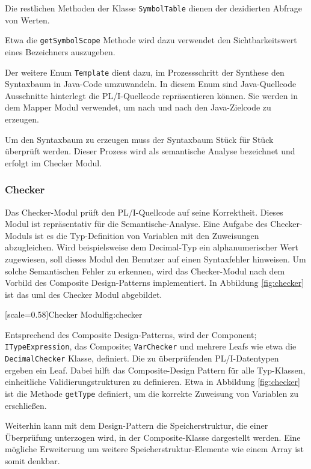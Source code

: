 Die restlichen Methoden der Klasse \verb+SymbolTable+ dienen der dezidierten Abfrage von Werten.

Etwa die \verb+getSymbolScope+ Methode wird dazu verwendet den Sichtbarkeitswert eines Bezeichners auszugeben.

Der weitere Enum \verb+Template+ dient dazu, im Prozessschritt der Synthese den Syntaxbaum in Java-Code umzuwandeln.
In diesem Enum sind Java-Quellcode Ausschnitte hinterlegt die PL/I-Quellcode repräsentieren können. Sie werden in dem Mapper Modul verwendet,
um nach und nach den Java-Zielcode zu erzeugen.

Um den Syntaxbaum zu erzeugen muss der Syntaxbaum Stück für Stück überprüft werden. Dieser Prozess wird als semantische Analyse bezeichnet und erfolgt im Checker Modul.
 
 \pagebreak
\subsubsection{Checker}
Das Checker-Modul prüft den PL/I-Quellcode auf seine Korrektheit. 
Dieses Modul ist repräsentativ für die Semantische-Analyse. 
Eine Aufgabe des Checker-Moduls ist es die Typ-Definition von Variablen mit den Zuweisungen abzugleichen.
Wird beispielsweise dem Decimal-Typ ein alphanumerischer Wert zugewiesen, soll dieses Modul den Benutzer auf einen Syntaxfehler hinweisen. Um solche Semantischen Fehler zu erkennen, wird das Checker-Modul nach dem Vorbild des Composite Design-Patterns implementiert. In Abbildung \ref{fig:checker} ist das \ac{uml} des Checker Modul abgebildet.

[scale=0.58]{Checker Modul}{fig:checker}
\pagebreak

Entsprechend des Composite Design-Patterns, wird der Component; \verb+ITypeExpression+, das Composite; \verb+VarChecker+ und mehrere Leafs wie etwa die \verb+DecimalChecker+ Klasse, definiert.
Die zu überprüfenden PL/I-Datentypen ergeben ein Leaf.
Dabei hilft das Composite-Design Pattern für alle Typ-Klassen, einheitliche Validierungstrukturen zu definieren.
Etwa in Abbildung \ref{fig:checker} ist die Methode \verb+getType+ definiert, um die korrekte Zuweisung von Variablen zu erschließen. 

Weiterhin kann mit dem Design-Pattern die Speicherstruktur, die einer Überprüfung unterzogen wird, in der Composite-Klasse dargestellt werden.
Eine mögliche Erweiterung um weitere Speicherstruktur-Elemente wie einem Array ist somit denkbar.

